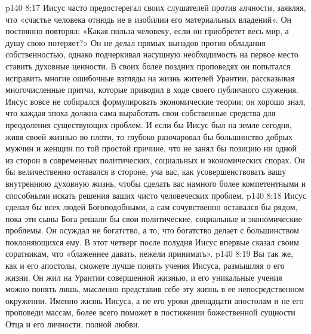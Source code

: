 \vs p140 8:17 Иисус часто предостерегал своих слушателей против алчности, заявляя, что «счастье человека отнюдь не в изобилии его материальных владений». Он постоянно повторял: «Какая польза человеку, если он приобретет весь мир, а душу свою потеряет?» Он не делал прямых выпадов против обладания собственностью, однако подчеркивал насущную необходимость на первое место ставить духовные ценности. В своих более поздних проповедях он попытался исправить многие ошибочные взгляды на жизнь жителей Урантии, рассказывая многочисленные притчи, которые приводил в ходе своего публичного служения. Иисус вовсе не собирался формулировать экономические теории; он хорошо знал, что каждая эпоха должна сама выработать свои собственные средства для преодоления существующих проблем. И если бы Иисус был на земле сегодня, живя своей жизнью во плоти, то глубоко разочаровал бы большинство добрых мужчин и женщин по той простой причине, что не занял бы позицию ни одной из сторон в современных политических, социальных и экономических спорах. Он бы величественно оставался в стороне, уча вас, как усовершенствовать вашу внутреннюю духовную жизнь, чтобы сделать вас намного более компетентными и способными искать решения ваших чисто человеческих проблем.
\vs p140 8:18 \pc Иисус сделал бы всех людей Богоподобными, а сам сочувственно оставался бы рядом, пока эти сыны Бога решали бы свои политические, социальные и экономические проблемы. Он осуждал не богатство, а то, что богатство делает с большинством поклоняющихся ему. В этот четверг после полудня Иисус впервые сказал своим соратникам, что «блаженнее давать, нежели принимать».
\vs p140 8:19 \bibnobreakspace {} Вы так же, как и его апостолы, сможете лучше понять учения Иисуса, размышляя о его жизни. Он жил на Урантии совершенной жизнью, и его уникальные учения можно понять лишь, мысленно представив себе эту жизнь в ее непосредственном окружении. Именно жизнь Иисуса, а не его уроки двенадцати апостолам и не его проповеди массам, более всего поможет в постижении божественной сущности Отца и его личности, полной любви.
